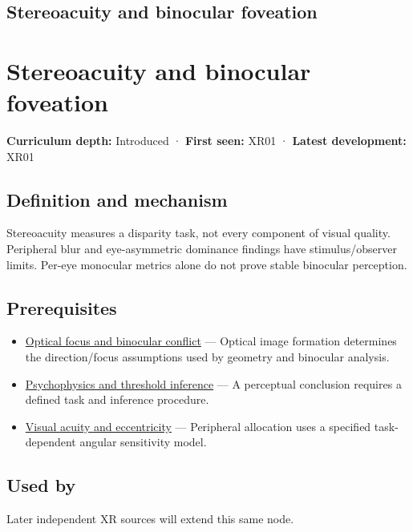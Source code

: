 \hypertarget{appendix-8dc848f14052}{}
\section*{Stereoacuity and binocular foveation}
\chapter{Stereoacuity and binocular foveation}\label{appendix-8dc848f14052-stereoacuity-and-binocular-foveation}

\textbf{Curriculum depth:} Introduced · \textbf{First seen:} XR01 · \textbf{Latest development:} XR01

\section{Definition and mechanism}\label{appendix-8dc848f14052-definition-and-mechanism}

Stereoacuity measures a disparity task, not every component of visual quality. Peripheral blur and eye-asymmetric dominance findings have stimulus/observer limits. Per-eye monocular metrics alone do not prove stable binocular perception.

\section{Prerequisites}\label{appendix-8dc848f14052-prerequisites}

\begin{itemize}
\tightlist
\item
  \hyperref[appendix-f90cee1be7a4]{Optical focus and binocular conflict} --- Optical image formation determines the direction/focus assumptions used by geometry and binocular analysis.
\item
  \hyperref[appendix-1759f03e8ce7]{Psychophysics and threshold inference} --- A perceptual conclusion requires a defined task and inference procedure.
\item
  \hyperref[appendix-b491fc48c54b]{Visual acuity and eccentricity} --- Peripheral allocation uses a specified task-dependent angular sensitivity model.
\end{itemize}

\section{Used by}\label{appendix-8dc848f14052-used-by}

Later independent XR sources will extend this same node.

